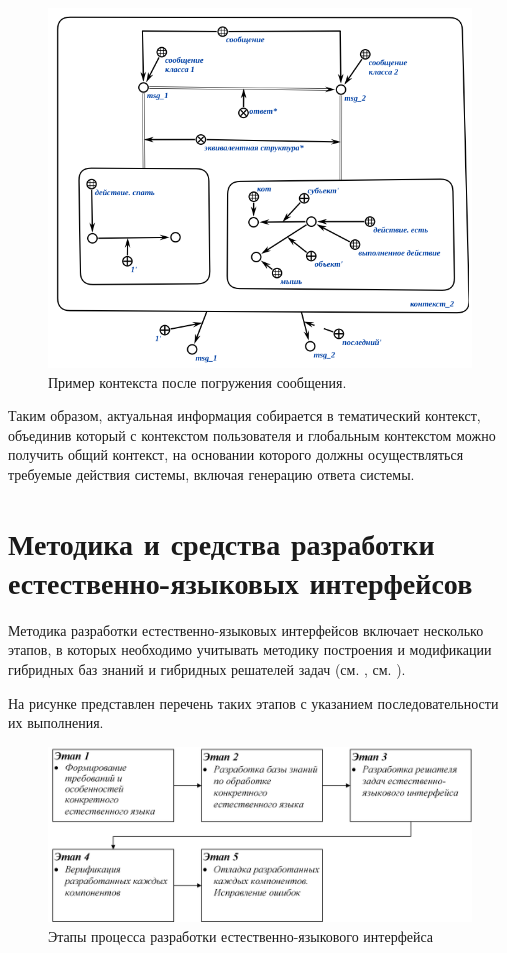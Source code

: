 {\begin{figure}[h]
    \centering
    \includegraphics[scale=0.8]{images/part4/chapter_nl_interfaces/context_2}
    \caption{Пример контекста после погружения сообщения.}
    \label{fig:updated_context}
\end{figure}

Таким образом, актуальная информация собирается в тематический контекст, объединив который с контекстом пользователя и глобальным контекстом можно получить общий контекст, на основании которого должны осуществляться требуемые действия системы, включая генерацию ответа системы.

\section{Методика и средства разработки естественно-языковых интерфейсов}
    
Методика разработки естественно-языковых интерфейсов включает несколько этапов, в которых необходимо учитывать методику построения и модификации гибридных баз знаний и гибридных решателей задач (см. , см. ).

На рисунке \textit{} представлен перечень таких этапов с указанием последовательности их выполнения.
\begin{figure}[H]
	\centering
	\includegraphics[scale=0.8,width=1.0\textwidth]{images/part4/chapter_chinese/method}
	\caption{Этапы процесса разработки естественно-языкового интерфейса}
	\label{fig:method-interface}
\end{figure}

}
